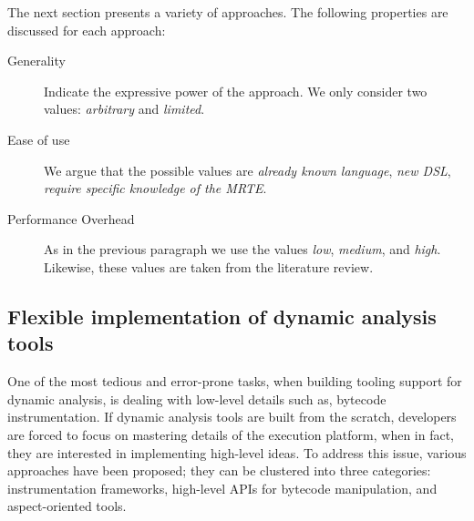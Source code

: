 The next section presents a variety of approaches. The following properties are discussed for each approach:

\begin{description}
\item[Generality] Indicate the expressive power of the approach. We only consider two values: \textit{arbitrary} and \textit{limited}.

\item[Ease of use] We argue that the possible values are \textit{already known language}, \textit{new DSL}, \textit{require specific knowledge of the MRTE}.

\item[Performance Overhead] As in the previous paragraph we use the values \textit{low}, \textit{medium}, and \textit{high}.
Likewise, these values are taken from the literature review.
\end{description}

\subsection{Flexible implementation of dynamic analysis tools}

One of the most tedious and error-prone tasks, when building tooling support for dynamic analysis, is dealing with low-level details such as, bytecode instrumentation.
If dynamic analysis tools are built from the scratch, developers are forced to focus on mastering details of the execution platform, when in fact, they are interested in implementing high-level ideas.
To address this issue, various approaches have been proposed; they can be clustered into three categories: instrumentation frameworks, high-level APIs for bytecode manipulation, and aspect-oriented tools.

